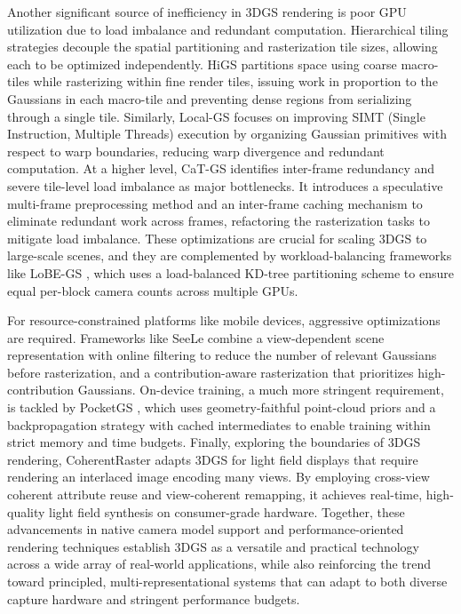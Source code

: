 \documentclass[11pt]{article}
\begin{document}
Another significant source of inefficiency in 3DGS rendering is poor GPU utilization due to load imbalance and redundant computation. Hierarchical tiling strategies decouple the spatial partitioning and rasterization tile sizes, allowing each to be optimized independently. HiGS \cite{ref26} partitions space using coarse macro-tiles while rasterizing within fine render tiles, issuing work in proportion to the Gaussians in each macro-tile and preventing dense regions from serializing through a single tile. Similarly, Local-GS \cite{ref112} focuses on improving SIMT (Single Instruction, Multiple Threads) execution by organizing Gaussian primitives with respect to warp boundaries, reducing warp divergence and redundant computation. At a higher level, CaT-GS \cite{ref40} identifies inter-frame redundancy and severe tile-level load imbalance as major bottlenecks. It introduces a speculative multi-frame preprocessing method and an inter-frame caching mechanism to eliminate redundant work across frames, refactoring the rasterization tasks to mitigate load imbalance. These optimizations are crucial for scaling 3DGS to large-scale scenes, and they are complemented by workload-balancing frameworks like LoBE-GS \cite{ref113}, which uses a load-balanced KD-tree partitioning scheme to ensure equal per-block camera counts across multiple GPUs.

For resource-constrained platforms like mobile devices, aggressive optimizations are required. Frameworks like SeeLe \cite{ref114} combine a view-dependent scene representation with online filtering to reduce the number of relevant Gaussians before rasterization, and a contribution-aware rasterization that prioritizes high-contribution Gaussians. On-device training, a much more stringent requirement, is tackled by PocketGS \cite{ref115}, which uses geometry-faithful point-cloud priors and a backpropagation strategy with cached intermediates to enable training within strict memory and time budgets. Finally, exploring the boundaries of 3DGS rendering, CoherentRaster \cite{ref116} adapts 3DGS for light field displays that require rendering an interlaced image encoding many views. By employing cross-view coherent attribute reuse and view-coherent remapping, it achieves real-time, high-quality light field synthesis on consumer-grade hardware. Together, these advancements in native camera model support and performance-oriented rendering techniques establish 3DGS as a versatile and practical technology across a wide array of real-world applications, while also reinforcing the trend toward principled, multi-representational systems that can adapt to both diverse capture hardware and stringent performance budgets.
\end{document}
